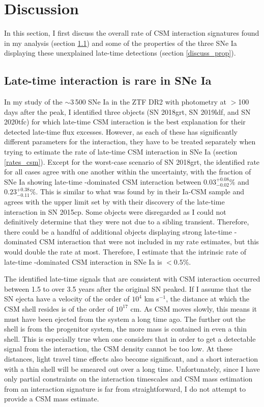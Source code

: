 \documentclass[a4paper,oneside,12pt, class=Latex/Classes/PhDthesisPSnPDF, crop=false]{standalone}
\begin{document}
\section{Discussion}
\label{DR2_discussion}
In this section, I first discuss the overall rate of CSM interaction signatures found in my analysis (section \ref{discuss_interaction}) and some of the properties of the three SNe Ia displaying these unexplained late-time detections (section \ref{discuss_prop}).


\subsection{Late-time interaction is rare in SNe Ia}
\label{discuss_interaction}
In my study of the $\sim$3\,500 SNe Ia in the ZTF DR2 with photometry at $>$100 days after the peak, I identified three objects (SN 2018grt, SN 2019ldf, and SN 2020tfc) for which late-time CSM interaction is the best explanation for their detected late-time flux excesses. However, as each of these has significantly different parameters for the interaction, they have to be treated separately when trying to estimate the rate of late-time CSM interaction in SNe Ia (section \ref{rates_csm}). Except for the worst-case scenario of SN 2018grt, the identified rate for all cases agree with one another within the uncertainty, with the fraction of SNe Ia showing late-time \Halpha-dominated CSM interaction between $0.03^{+0.08}_{-0.02}$\% and $0.23^{+0.38}_{-0.11}$\%. This is similar to what was found by \citet{Ia-CSM_BTS} in their Ia-CSM sample and agrees with the upper limit set by \citet{2015cp} with their discovery of the late-time interaction in SN 2015cp. Some objects were disregarded as I could not definitively determine that they were not due to a sibling transient. Therefore, there could be a handful of additional objects displaying strong late-time \Halpha-dominated CSM interaction that were not included in my rate estimates, but this would double the rate at most. Therefore, I estimate that the intrinsic rate of late-time \Halpha-dominated CSM interaction in SNe Ia is $<0.5$\%.

The identified late-time signals that are consistent with CSM interaction occurred between 1.5 to over 3.5 years after the original SN peaked. If I assume that the SN ejecta have a velocity of the order of $10^4$ km s$^{-1}$, the distance at which the CSM shell resides is of the order of $10^{17}$ cm. As CSM moves slowly, this means it must have been ejected from the system a long time ago. The further out the shell is from the progenitor system, the more mass is contained in even a thin shell. This is especially true when one considers that in order to get a detectable signal from the interaction, the CSM density cannot be too low. At these distances, light travel time effects also become significant, and a short interaction with a thin shell will be smeared out over a long time. Unfortunately, since I have only partial constraints on the interaction timescales and CSM mass estimation from an interaction signature is far from straightforward, I do not attempt to provide a CSM mass estimate.
\end{document}
